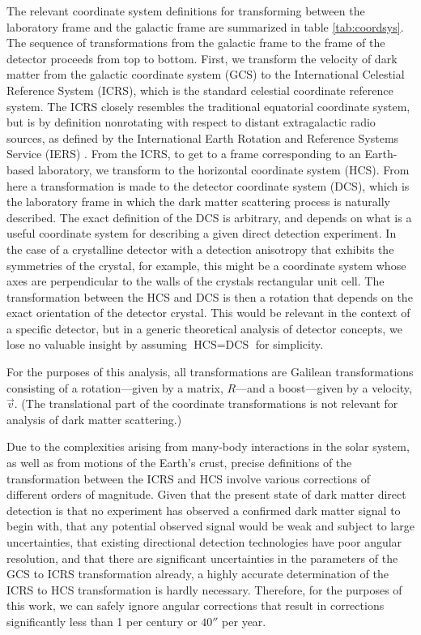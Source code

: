 The relevant coordinate system definitions for transforming between the laboratory frame and the galactic frame are summarized in table \ref{tab:coordsys}. The sequence of transformations from the galactic frame to the frame of the detector proceeds from top to bottom. First, we transform the velocity of dark matter from the galactic coordinate system (GCS) to the International Celestial Reference System (ICRS), which is the standard celestial coordinate reference system. The ICRS closely resembles the traditional equatorial coordinate system, but is by definition nonrotating with respect to distant extragalactic radio sources, as defined by the International Earth Rotation and Reference Systems Service (IERS) \parencite{MaFeissel1997}. From the ICRS, to get to a frame corresponding to an Earth-based laboratory, we transform to the horizontal coordinate system (HCS). From here a transformation is made to the detector coordinate system (DCS), which is the laboratory frame in which the dark matter scattering process is naturally described. The exact definition of the DCS is arbitrary, and depends on what is a useful coordinate system for describing a given direct detection experiment. In the case of a crystalline detector with a detection anisotropy that exhibits the symmetries of the crystal, for example, this might be a coordinate system whose axes are perpendicular to the walls of the crystals rectangular unit cell. The transformation between the HCS and DCS is then a rotation that depends on the exact orientation of the detector crystal. This would be relevant in the context of a specific detector, but in a generic theoretical analysis of detector concepts, we lose no valuable insight by assuming $\text{HCS}=\text{DCS}$ for simplicity.

For the purposes of this analysis, all transformations are Galilean transformations consisting of a rotation---given by a matrix, $R$---and a boost---given by a velocity, $\vec{v}$. (The translational part of the coordinate transformations is not relevant for analysis of dark matter scattering.)

Due to the complexities arising from many-body interactions in the solar system, as well as from motions of the Earth's crust, precise definitions of the transformation between the ICRS and HCS involve various corrections of different orders of magnitude. Given that the present state of dark matter direct detection is that no experiment has observed a confirmed dark matter signal to begin with, that any potential observed signal would be weak and subject to large uncertainties, that existing directional detection technologies have poor angular resolution, and that there are significant uncertainties in the parameters of the GCS to ICRS transformation already, a highly accurate determination of the ICRS to HCS transformation is hardly necessary. Therefore, for the purposes of this work, we can safely ignore angular corrections that result in corrections significantly less than 1\degree{} per century or $40''$ per year.

